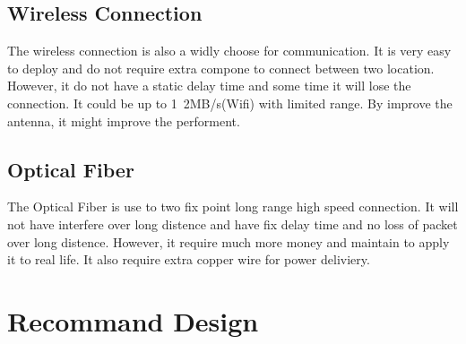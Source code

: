 \documentclass[12pt,article]{memoir}
\begin{document}
\section{Wireless Connection}
The wireless connection is also a widly choose for communication. It is very easy to deploy and do not require extra compone to connect between two location. However, it do not have a static delay time and some time it will lose the connection. It could be up to 1~2MB/s(Wifi) with limited range. By improve the antenna, it might improve the performent.
\section{Optical Fiber}
The Optical Fiber is use to two fix point long range high speed connection. It will not have interfere over long distence and have fix delay time and no loss of packet over long distence. However, it require much more money and maintain to apply it to real life. It also require extra copper wire for power deliviery.
\newpage
\chapter{Recommand Design}
\end{document}
